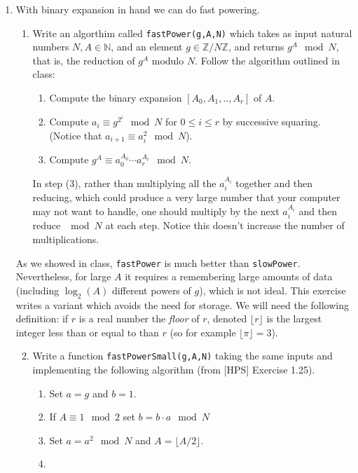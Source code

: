\documentclass[11pt]{article}
\newcommand{\bN}{\mathbb{N}}
\newcommand{\bZ}{\mathbb{Z}}
\begin{document}
\begin{enumerate}
{  }
  \item{
  With binary expansion in hand we can do fast powering.
  \begin{enumerate}
    \item{
    Write an algorthim called \verb|fastPower(g,A,N)| which takes as input natural numbers $N,A\in\bN$, and an element $g\in\bZ/N\bZ$, and returns $g^A\mod N$, that is, the reduction of $g^A$ modulo $N$.  Follow the algorithm outlined in class:
    \begin{enumerate}[(1)]
      \item{
      Compute the binary expansion $[A_0,A_1,..,A_r]$ of $A$.
      }
      \item{
      Compute $a_i \equiv g^{2^i}\mod N$ for $0\le i\le r$ by successive squaring.  (Notice that $a_{i+1}\equiv a_i^2\mod N$).
      }
      \item{
      Compute $g^A \equiv a_0^{A_0}\cdots a_r^{A_r}\mod N$.
      }
    \end{enumerate}
    In step (3), rather than multiplying all the $a_i^{A_i}$ together and then reducing, which could produce a very large number that your computer may not want to handle, one should multiply by the next $a_i^{A_i}$ and then reduce $\mod N$ at each step.  Notice this doesn't increase the number of multiplications.
    }
  \end{enumerate}
  As we showed in class, \verb|fastPower| is much better than \verb|slowPower|.  Nevertheless, for large $A$ it requires a remembering large amounts of data (including $\log_2(A)$ different powers of $g$), which is not ideal.  This exercise writes a variant which avoids the need for storage.  We will need the following definition: if $r$ is a real number the \textit{floor} of $r$, denoted $\lfloor r\rfloor$ is the largest integer less than or equal to than $r$ (so for example $\lfloor \pi\rfloor = 3$).
  \begin{enumerate}
    \setcounter{enumii}{1}
    \item{
    Write a function \verb|fastPowerSmall(g,A,N)| taking the same inputs and implementing the following algorithm (from [HPS] Exercise 1.25).
    \begin{enumerate}[(1)]
      \item{
      Set $a = g$ and $b = 1$.
      }
      \item{
      If $A\equiv1\mod 2$ set $b = b\cdot a\mod N$
      }
      \item{
      Set $a = a^2\mod N$ and $A = \lfloor{A}/{2}\rfloor$.
      }
      \item{
}
\end{enumerate}}
\end{enumerate}}
\end{enumerate}
\end{document}
